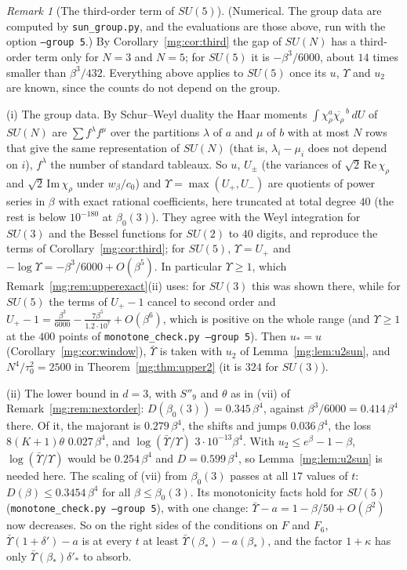 \documentclass[11pt,a4paper]{article}
\theoremstyle{definition}
\theoremstyle{remark}
\newtheorem{remark}[theorem]{Remark}
\newcommand{\dU}{\,dU}
\begin{document}
\begin{remark}[The third-order term of $SU(5)$]\label{mg:rem:su5}
(Numerical. The group data are computed by \texttt{sun\_group.py}, and the evaluations are those above, run with the option \texttt{--group 5}.) By Corollary~\ref{mg:cor:third} the gap of $SU(N)$ has a third-order term only for $N=3$ and $N=5$; for $SU(5)$ it is $-\beta^3/6000$, about $14$ times smaller than $\beta^3/432$. Everything above applies to $SU(5)$ once its
$u$, $\Upsilon$ and $u_2$ are known, since the counts do not depend on the group.

(i) The group data. By Schur--Weyl duality the Haar moments $\int\chi_\rho^a\overline{\chi_\rho}^{\,b}\dU$ of $SU(N)$ are $\sum f^\lambda f^\mu$ over the partitions $\lambda$ of $a$ and $\mu$ of $b$ with at
most $N$ rows that give the same representation of $SU(N)$ (that is, $\lambda_i-\mu_i$ does not depend on $i$), $f^\lambda$ the number of standard tableaux. So $u$, $U_\pm$ (the variances of
$\sqrt2\,\mathrm{Re}\,\chi_\rho$ and $\sqrt2\,\mathrm{Im}\,\chi_\rho$ under $w_\beta/c_0$) and $\Upsilon=\max(U_+,U_-)$ are quotients of power series in $\beta$ with exact rational coefficients, here truncated at total
degree $40$ (the rest is below $10^{-180}$ at $\beta_0(3)$). They agree with the Weyl integration for $SU(3)$ and the Bessel functions for $SU(2)$ to $40$ digits, and reproduce the terms of
Corollary~\ref{mg:cor:third}; for $SU(5)$, $\Upsilon=U_+$ and $-\log\Upsilon=-\beta^3/6000+O(\beta^5)$. In particular $\Upsilon\ge1$, which Remark~\ref{mg:rem:upperexact}(ii) uses: for $SU(3)$ this
was shown there, while for $SU(5)$ the terms of $U_+-1$ cancel to second order and $U_+-1=\frac{\beta^3}{6000}-\frac{7\beta^5}{1.2\cdot10^7}+O(\beta^6)$, which is positive on the whole range
(and $\Upsilon\ge1$ at the $400$ points of \texttt{monotone\_check.py --group 5}). Then $u_*=u$ (Corollary~\ref{mg:cor:window}), $\bar\Upsilon$ is taken with $u_2$ of
Lemma~\ref{mg:lem:u2sun}, and $N^4/\tau_0^2=2500$ in Theorem~\ref{mg:thm:upper2} (it is $324$ for $SU(3)$).

(ii) The lower bound in $d=3$, with $S''_9$ and $\theta$ as in (vii) of Remark~\ref{mg:rem:nextorder}: $D(\beta_0(3))=0.345\,\beta^4$, against $\beta^3/6000=0.414\,\beta^4$ there. Of it, the majorant is $0.279\,\beta^4$, the
shifts and jumps $0.036\,\beta^4$, the loss $8(K+1)\theta$ $0.027\,\beta^4$, and $\log(\bar\Upsilon/\Upsilon)$ $3\cdot10^{-13}\beta^4$. With $u_2\le e^\beta-1-\beta$, $\log(\bar\Upsilon/\Upsilon)$ would be $0.254\,\beta^4$ and
$D=0.599\,\beta^4$, so Lemma~\ref{mg:lem:u2sun} is needed here. The scaling of (vii) from $\beta_0(3)$ passes at all $17$ values of $t$: $D(\beta)\le0.3454\,\beta^4$ for all $\beta\le\beta_0(3)$. Its monotonicity
facts hold for $SU(5)$ (\texttt{monotone\_check.py --group 5}), with one change: $\bar\Upsilon-a=1-\beta/50+O(\beta^2)$ now decreases. So on the right sides of the conditions on $F$ and $F_6$, $\bar\Upsilon(1+\delta')-a$ is at
every $t$ at least $\bar\Upsilon(\beta_*)-a(\beta_*)$, and the factor $1+\kappa$ has only $\bar\Upsilon(\beta_*)\delta'_*$ to absorb.


\end{remark}
\end{document}
